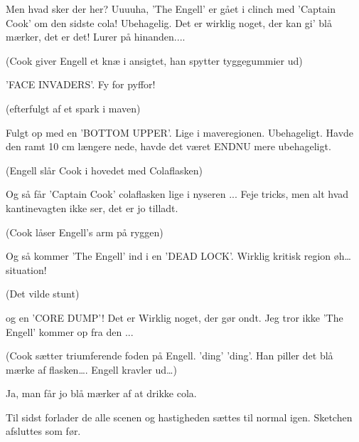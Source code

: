 \documentclass[10pt]{article}
\begin{document}
\begin{sketch}
   Men hvad sker der her?  Uuuuha, 'The Engell' er gået i
  clinch med 'Captain Cook' om den sidste cola!  Ubehagelig. Det er wirklig
  noget, der kan gi' blå mærker, det er det!  Lurer på hinanden....

  \scene (Cook giver Engell et knæ i ansigtet, han spytter tyggegummier ud)

   'FACE INVADERS'. Fy for pyffor!

  \scene (efterfulgt af et spark i maven)

   Fulgt op med en 'BOTTOM UPPER'. Lige i maveregionen.
  Ubehageligt. Havde den ramt 10 cm længere nede, havde det været ENDNU
  mere ubehageligt.

  \scene (Engell slår Cook i hovedet med Colaflasken)

   Og så får 'Captain Cook' colaflasken lige i nyseren ... Feje
  tricks, men alt hvad kantinevagten ikke ser, det er jo tilladt.

  \scene (Cook låser Engell's arm på ryggen)

   Og så kommer 'The Engell' ind i en 'DEAD LOCK'. Wirklig
  kritisk region øh\ldots situation!

  \scene (Det vilde stunt)

   og en 'CORE DUMP'! Det er Wirklig noget, der gør ondt. Jeg
  tror ikke 'The Engell' kommer op fra den ...

  \scene (Cook sætter triumferende foden på Engell. 'ding' 'ding'. Han
  piller det blå mærke af flasken\ldots. Engell kravler ud\ldots)

   Ja, man får jo blå mærker af at drikke cola.

  \scene Til sidst forlader de alle scenen og hastigheden sættes til normal
  igen. Sketchen afsluttes som før.

\end{sketch}
\end{document}
